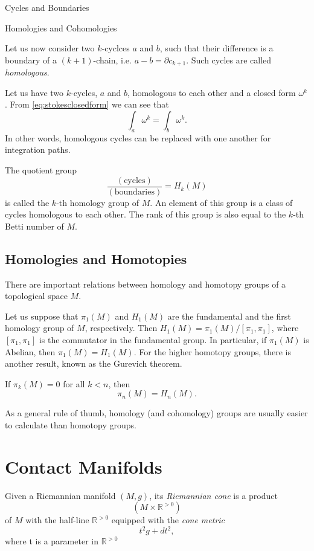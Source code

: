 \begin{subsubsection}{Cycles and Boundaries}
\begin{subsubsection}{Homologies and Cohomologies}
  \begin{definition}
  Let us now consider two $k$-cyclces $a$ and $b$, such that their 
  difference is a boundary of a $(k+1)$-chain, i.e. $a-b = \partial c_{k+1}$.
  Such cycles are called \textit{homologous}.
\end{definition}
  Let us have two $k$-cycles, $a$ and $b$, homologous to each other and
  a closed form $\omega^k$. From \eqref{eq:stokesclosedform} we can see that 
  \begin{equation}
    \int_a{\omega^k} = \int_b{\omega^k}.
  \end{equation}
  In other words, homologous cycles can be replaced with one another for
  integration paths.
  \begin{definition}
    The quotient group
    \begin{equation}
      \frac{(\text{cycles})}{(\text{boundaries})} = H_k(M)
    \end{equation}
    is called the $k$-th homology group of $M$. An element of this group is
    a class of cycles homologous to each other. The rank of this group is also
    equal to the $k$-th Betti number of $M$.
  \end{definition}
\subsection{Homologies and Homotopies}
There are important relations between homology and homotopy groups of
a topological space $M$.
\par Let us suppose that $\pi_1(M)$ and $H_1(M)$ are the fundamental and the
first homology group of $M$, respectively. Then $H_1(M)
= \pi_1(M)/[\pi_1,\pi_1]$, where $[\pi_1,\pi_1]$ is the commutator in the
fundamental group. In particular, if $\pi_1(M)$ is Abelian, then $\pi_1(M)
= H_1(M)$. For the higher homotopy groups, there is another result, known as
the Gurevich theorem.
\begin{theorem}
  If $\pi_k(M) = 0$ for all $k<n$, then
  \begin{equation}
    \pi_n(M) = H_n(M).
  \end{equation}
\end{theorem}
As a general rule of thumb, homology (and cohomology) groups are usually easier
to calculate than homotopy groups.
    \section{Contact Manifolds}
\begin{definition}
Given a Riemannian manifold $(M,g)$, its \textit{Riemannian cone} is a product
\begin{equation}
(M\times\mathbb{R}^{>0})
\end{equation}
of $M$ with the half-line $\mathbb{R}^{>0}$ equipped with the \textit{cone metric}
\begin{equation}
t^2g+dt^2,
\end{equation}
where t is a parameter in $\mathbb{R}^{>0}$
\end{definition}


\end{subsubsection}
\end{subsubsection}
